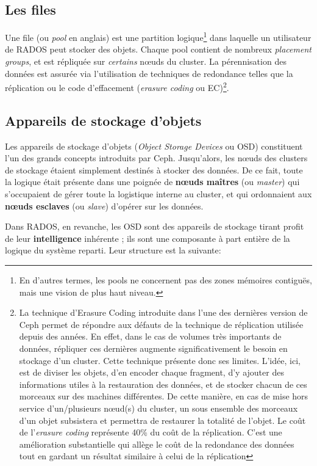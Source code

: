 \subsection{Les files}

Une file (ou \emph{pool} en anglais) est une partition logique\footnote{En d'autres termes, les pools ne concernent pas des zones mémoires contiguës, mais une vision de plus haut niveau.} dans laquelle un utilisateur de RADOS peut stocker des objets. Chaque pool contient de nombreux \emph{placement groups}, et est répliquée sur \textit{certains} nœuds du cluster. La pérennisation des données est assurée via l'utilisation de techniques de redondance telles que la réplication ou le code d'effacement (\emph{erasure coding} ou EC)\footnote{La technique d'Erasure Coding introduite dans l'une des dernières version de Ceph permet de répondre aux défauts de la technique de réplication utilisée depuis des années. En effet, dans le cas de volumes très importants de données, répliquer ces dernières augmente significativement le besoin en stockage d'un cluster. Cette technique présente donc ses limites. L'idée, ici, est de diviser les objets, d'en encoder chaque fragment, d'y ajouter des informations utiles à la restauration des données, et de stocker chacun de ces morceaux sur des machines différentes. De cette manière, en cas de mise hors service d'un/plusieurs nœud(s) du cluster, un sous ensemble des morceaux d'un objet subsistera et permettra de restaurer la totalité de l'objet. Le coût de l'\emph{erasure coding} représente 40\% du coût de la réplication. C'est une amélioration substantielle qui allège le coût de la redondance des données tout en gardant un résultat similaire à celui de la réplication}.

\subsection{Appareils de stockage d'objets}

Les appareils de stockage d'objets (\textit{Object Storage Devices} ou OSD) constituent l'un des grands concepts introduits par Ceph. Jusqu'alors, les nœuds des clusters de stockage étaient simplement destinés à stocker des données. De ce fait, toute la logique était présente dans une poignée de \textbf{nœuds maîtres} (ou \textit{master}) qui s'occupaient de gérer toute la logistique interne au cluster, et qui ordonnaient aux \textbf{nœuds esclaves} (ou \textit{slave}) d'opérer sur les données. 

Dans RADOS, en revanche, les OSD sont des appareils de stockage tirant profit de leur \textbf{intelligence} inhérente ; ils sont une composante à part entière de la logique du système reparti. Leur structure est la suivante: 

